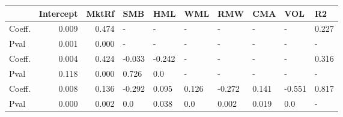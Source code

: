 \begin{tabular}{lrrlllllll}
\toprule
{} &  Intercept &  MktRf &    SMB &    HML &    WML &    RMW &    CMA &    VOL &     R2 \\
\midrule
Coeff.  &      0.009 &  0.474 &      - &      - &      - &      - &      - &      - &  0.227 \\
Pval    &      0.001 &  0.000 &      - &      - &      - &      - &      - &      - &      - \\
Coeff.  &      0.004 &  0.424 & -0.033 & -0.242 &      - &      - &      - &      - &  0.316 \\
Pval    &      0.118 &  0.000 &  0.726 &    0.0 &      - &      - &      - &      - &      - \\
Coeff.  &      0.008 &  0.136 & -0.292 &  0.095 &  0.126 & -0.272 &  0.141 & -0.551 &  0.817 \\
Pval    &      0.000 &  0.002 &    0.0 &  0.038 &    0.0 &  0.002 &  0.019 &    0.0 &      - \\
\bottomrule
\end{tabular}
